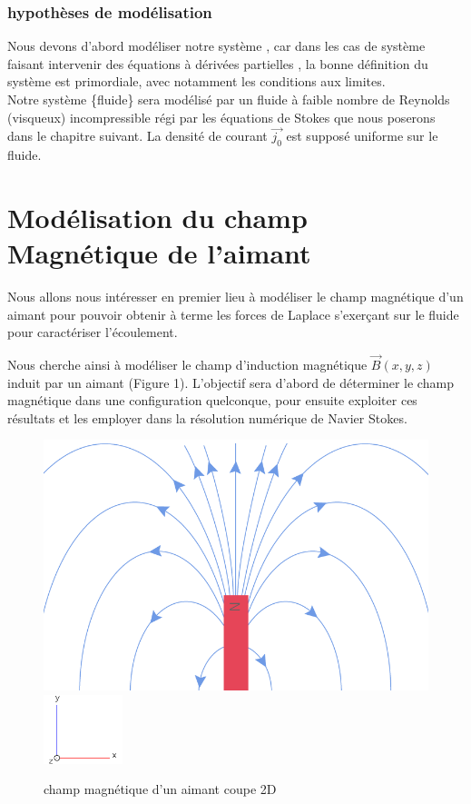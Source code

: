 \documentclass[a4paper,12pt,titlepage]{report}
\begin{document}
\begin{onehalfspace}
\subsection{hypothèses de modélisation}
Nous devons d'abord modéliser notre système , car dans les cas de système faisant intervenir des équations à dérivées partielles , la bonne définition du système est primordiale, avec notamment les conditions aux limites.\\
Notre système \{fluide\} sera modélisé par un fluide à faible nombre de Reynolds (visqueux) incompressible régi par les équations de Stokes que nous poserons dans le chapitre suivant. La densité de courant $\vec{j_0}$ est supposé uniforme sur le fluide.


\newpage
\chapter{Modélisation du champ Magnétique de l'aimant}

Nous allons nous intéresser en premier lieu à modéliser le champ magnétique d'un aimant pour pouvoir obtenir à terme les forces de Laplace s'exerçant sur le fluide pour caractériser l'écoulement.

Nous cherche ainsi à modéliser le champ d'induction magnétique $\vec{B}(x,y,z)$ induit par un aimant (Figure 1). L'objectif sera d'abord de déterminer le champ magnétique dans une configuration quelconque, pour ensuite exploiter ces résultats et les employer dans la résolution numérique de Navier Stokes. \\
\begin{figure}[h]
\begin{center}
\includegraphics[height =4 cm, keepaspectratio]{graphes/champ_aimant1.png} %
\includegraphics[height = 2cm, keepaspectratio]{graphes/axes.png}
\caption{champ magnétique d'un aimant coupe 2D}
\label{figure 1}
\end{center}
\end{figure}


\end{onehalfspace}
\end{document}
